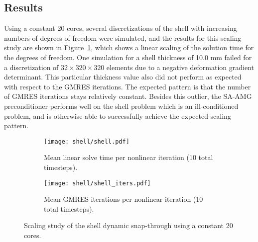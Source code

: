 \subsection{Results}
Using a constant 20 cores, several discretizations of the shell with increasing numbers of degrees of freedom were simulated, and the results for this scaling study are shown in Figure~\ref{fig:shell_scaling}, which shows a linear scaling of the solution time for the degrees of freedom. One simulation for a shell thickness of 10.0 mm failed for a discretization of $32 \times 320 \times 320$ elements due to a negative deformation gradient determinant. This particular thickness value also did not perform as expected with respect to the GMRES iterations. The expected pattern is that the number of GMRES iterations stays relatively constant. Besides this outlier, the SA-AMG preconditioner performs well on the shell problem which is an ill-conditioned problem, and is otherwise able to successfully achieve the expected scaling pattern.

\begin{figure}[ht]
    \centering
    \begin{subfigure}{\columnwidth}
        \centering
        \texttt{[image: shell/shell.pdf]}
        \caption{Mean linear solve time per nonlinear iteration (10 total timesteps).}
    \end{subfigure}
    \begin{subfigure}{\columnwidth}
        \centering
        \texttt{[image: shell/shell\_iters.pdf]}
        \caption{Mean GMRES iterations per nonlinear iteration (10 total timesteps).}
    \end{subfigure}
    \caption{Scaling study of the shell dynamic snap-through using a constant 20 cores.}
    \label{fig:shell_scaling}
\end{figure}
